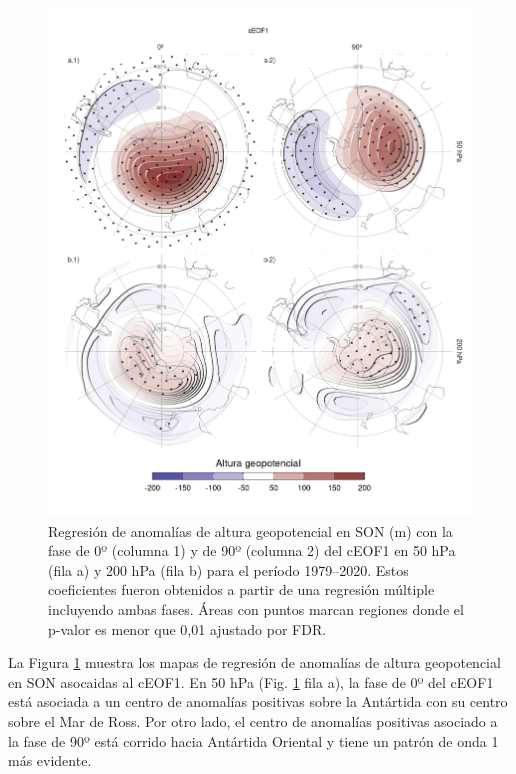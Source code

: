 \documentclass[12pt,oneside,a4paper]{reedthesis}
\begin{document}
\begin{figure}

{\centering \includegraphics{figures/20-ceofs/eof1-regr-gh-1} 

}

\caption{Regresión de anomalías de altura geopotencial en SON (m) con la fase de 0º (columna 1) y de 90º (columna 2) del cEOF1 en 50 hPa (fila a) y 200 hPa (fila b) para el período 1979--2020. Estos coeficientes fueron obtenidos a partir de una regresión múltiple incluyendo ambas fases. Áreas con puntos marcan regiones donde el p-valor es menor que 0,01 ajustado por FDR.}\label{fig:eof1-regr-gh}
\end{figure}

La Figura \ref{fig:eof1-regr-gh} muestra los mapas de regresión de anomalías de altura geopotencial en SON asocaidas al cEOF1.
En 50 hPa (Fig. \ref{fig:eof1-regr-gh} fila a), la fase de 0º del cEOF1 está asociada a un centro de anomalías positivas sobre la Antártida con su centro sobre el Mar de Ross.
Por otro lado, el centro de anomalías positivas asociado a la fase de 90º está corrido hacia Antártida Oriental y tiene un patrón de onda 1 más evidente.
\end{document}
